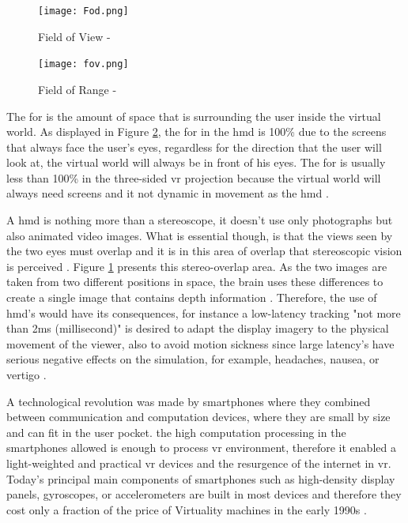 \begin{figure}[ht]
    \centering
    \texttt{[image: Fod.png]}
    \caption{Field of View - \citep{William}}
    \label{fig:field}
\end{figure}


\begin{figure}[ht]
    \centering
    \texttt{[image: fov.png]}
    \caption{Field of Range - \citep{William}}
    \label{fig:fod}
\end{figure}

The \acrfull{for} is the amount of space that is surrounding the user inside the virtual world. As displayed in Figure \ref{fig:fod}, the \acrshort{for} in the \acrshort{hmd} is 100\% due to the screens that always face the user's eyes, regardless for the direction that the user will look at, the virtual world will always be in front of his eyes. The \acrshort{for} is usually less than 100\% in the three-sided \acrshort{vr} projection because the virtual world will always need screens and it not dynamic in movement as the \acrlong{hmd} \citep{William}.

A \acrshort{hmd} is nothing more than a stereoscope, it doesn't use only photographs but also animated
video images. What is essential though, is that the views seen by the two eyes
must overlap and it is in this area of overlap that stereoscopic vision is perceived \citep{Vince2011}.
Figure \ref{fig:field} presents this stereo-overlap area. As the two images are taken from two different positions in space, the brain uses these
differences to create a single image that contains depth information \citep{Vince2011}. Therefore, the use of \acrshort{hmd}'s would have its consequences, for instance a low-latency tracking "not more than 2ms (millisecond)" is desired to adapt the display imagery to the physical movement of the viewer, also to avoid motion sickness since large latency's have serious negative effects on the simulation, for example, headaches, nausea, or vertigo \citep{burdea2017virtual, Vince2011, Steinicke2016}.

A technological revolution was made by smartphones where they combined between communication and computation devices, where they are small by size and can fit in the user pocket. the high computation processing in the smartphones allowed is enough to process \acrshort{vr} environment, therefore it enabled a light-weighted and practical \acrshort{vr} devices and the resurgence of the internet in \acrshort{vr}. Today’s principal main components 
of smartphones such as high-density display panels, gyroscopes, or accelerometers 
are built in most devices and therefore they cost only a fraction of the price of 
Virtuality machines in the early 1990s \citep{Steinicke2016}. 



